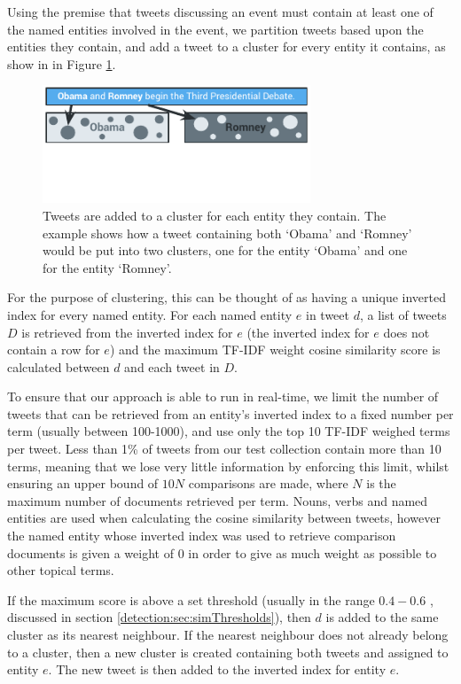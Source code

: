 Using the premise that tweets discussing an event must contain at least one of the named entities involved in the event, we partition tweets based upon the entities they contain, and add a tweet to a cluster for every entity it contains, as show in in Figure \ref{detection:graphic:clustering}.

\begin{figure}[h!]
	\centering
	\includegraphics[width=8cm,trim=0cm 1.5cm 0cm 0cm]{Chapters/EntityDetection/images/clustering.pdf}
	\caption[Entity-based clustering]{Tweets are added to a cluster for each entity they contain. The example shows how a tweet containing both `Obama' and `Romney' would be put into two clusters, one for the entity `Obama' and one for the entity `Romney'.}
	\label{detection:graphic:clustering}
\end{figure}

For the purpose of clustering, this can be thought of as having a unique inverted index for every named entity. For each named entity $e$ in tweet $d$, a list of tweets $D$ is retrieved from the inverted index for $e$ (the inverted index for $e$ does not contain a row for $e$) and the maximum TF-IDF weight cosine similarity score is calculated between $d$ and each tweet in $D$.

To ensure that our approach is able to run in real-time, we limit the number of tweets that can be retrieved from an entity's inverted index to a fixed number per term (usually between 100-1000), and use only the top 10 TF-IDF weighed terms per tweet. Less than 1\% of tweets from our test collection contain more than 10 terms, meaning that we lose very little information by enforcing this limit, whilst ensuring an upper bound of \(10N\) comparisons are made, where \(N\) is the maximum number of documents retrieved per term. Nouns, verbs and named entities are used when calculating the cosine similarity between tweets, however the named entity whose inverted index was used to retrieve comparison documents is given a weight of 0 in order to give as much weight as possible to other topical terms.

If the maximum score is above a set threshold (usually in the range \(0.4-0.6\) \citep{Petrovic10}, discussed in section \ref{detection:sec:simThresholds}), then $d$ is added to the same cluster as its nearest neighbour. If the nearest neighbour does not already belong to a cluster, then a new cluster is created containing both tweets and assigned to entity $e$. The new tweet is then added to the inverted index for entity $e$.

